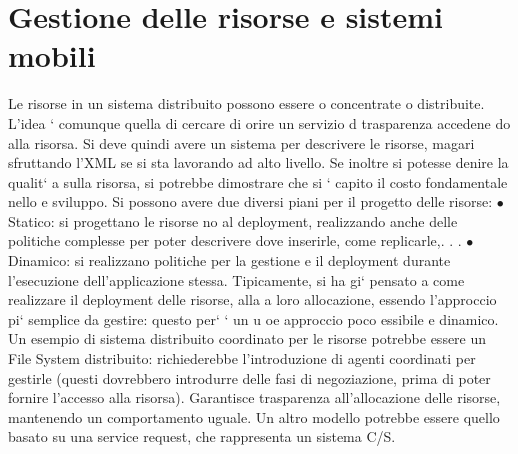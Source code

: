\documentclass[a4paper,12pt]{article}
\begin{document}
\section{Gestione delle risorse e sistemi mobili}
Le risorse in un sistema distribuito possono essere o concentrate o distribuite.
L'idea ` comunque quella di cercare di orire un servizio d trasparenza accedene
do alla risorsa.
Si deve quindi avere un sistema per descrivere le risorse, magari sfruttando
l'XML se si sta lavorando ad alto livello. Se inoltre si potesse denire la qualit`
a
sulla risorsa, si potrebbe dimostrare che si ` capito il costo fondamentale nello
e
sviluppo.
Si possono avere due diversi piani per il progetto delle risorse:
$\bullet$ Statico: si progettano le risorse no al deployment, realizzando anche delle
politiche complesse per poter descrivere dove inserirle, come replicarle,. . .
$\bullet$ Dinamico: si realizzano politiche per la gestione e il deployment durante
l'esecuzione dell'applicazione stessa.
Tipicamente, si ha gi` pensato a come realizzare il deployment delle risorse, alla
a
loro allocazione, essendo l'approccio pi` semplice da gestire: questo per` ` un
u
oe
approccio poco essibile e dinamico.
Un esempio di sistema distribuito coordinato per le risorse potrebbe essere
un File System distribuito: richiederebbe l'introduzione di agenti coordinati per
gestirle (questi dovrebbero introdurre delle fasi di negoziazione, prima di poter
fornire l'accesso alla risorsa). Garantisce trasparenza all'allocazione delle risorse,
mantenendo un comportamento uguale. Un altro modello potrebbe essere quello
basato su una service request, che rappresenta un sistema C/S.
\end{document}
